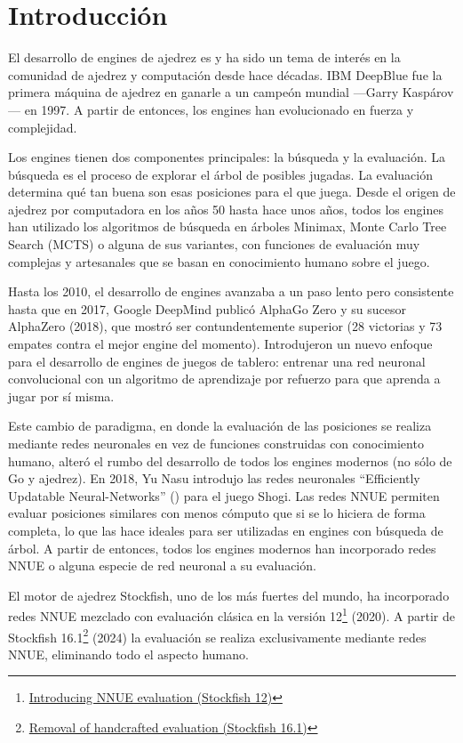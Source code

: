 \section*{Introducción}

El desarrollo de engines de ajedrez es y ha sido un tema de interés en la comunidad de ajedrez y computación desde hace décadas. IBM DeepBlue \cite{deepblue:2002} fue la primera máquina de ajedrez en ganarle a un campeón mundial ---Garry Kaspárov--- en 1997. A partir de entonces, los engines han evolucionado en fuerza y complejidad.

Los engines tienen dos componentes principales: la búsqueda y la evaluación. La búsqueda es el proceso de explorar el árbol de posibles jugadas. La evaluación determina qué tan buena son esas posiciones para el que juega. Desde el origen de ajedrez por computadora en los años 50 hasta hace unos años, todos los engines han utilizado los algoritmos de búsqueda en árboles Minimax, Monte Carlo Tree Search \cite{mcts-survey:2012} (MCTS) o alguna de sus variantes, con funciones de evaluación muy complejas y artesanales que se basan en conocimiento humano sobre el juego.

Hasta los 2010, el desarrollo de engines avanzaba a un paso lento pero consistente hasta que en 2017, Google DeepMind publicó AlphaGo Zero \cite{alphagozero:2017} y su sucesor AlphaZero \cite{alphazero:2017,alphazero:2018} (2018), que mostró ser contundentemente superior (28 victorias y 73 empates contra el mejor engine del momento). Introdujeron un nuevo enfoque para el desarrollo de engines de juegos de tablero: entrenar una red neuronal convolucional con un algoritmo de aprendizaje por refuerzo para que aprenda a jugar por sí misma.

Este cambio de paradigma, en donde la evaluación de las posiciones se realiza mediante redes neuronales en vez de funciones construidas con conocimiento humano, alteró el rumbo del desarrollo de todos los engines modernos (no sólo de Go y ajedrez). En 2018, Yu Nasu introdujo las redes neuronales ``Efficiently Updatable Neural-Networks''  \cite{nnue:2018} () para el juego Shogi. Las redes NNUE permiten evaluar posiciones similares con menos cómputo que si se lo hiciera de forma completa, lo que las hace ideales para ser utilizadas en engines con búsqueda de árbol. A partir de entonces, todos los engines modernos han incorporado redes NNUE o alguna especie de red neuronal a su evaluación.

El motor de ajedrez Stockfish, uno de los más fuertes del mundo, ha incorporado redes NNUE mezclado con evaluación clásica en la versión 12\footnote[1]{\href{https://stockfishchess.org/blog/2020/introducing-nnue-evaluation/}{Introducing NNUE evaluation (Stockfish 12)}} (2020). A partir de Stockfish 16.1\footnote[2]{\href{https://stockfishchess.org/blog/2024/stockfish-16-1/}{Removal of handcrafted evaluation (Stockfish 16.1)}} (2024) la evaluación se realiza exclusivamente mediante redes NNUE, eliminando todo el aspecto humano.

